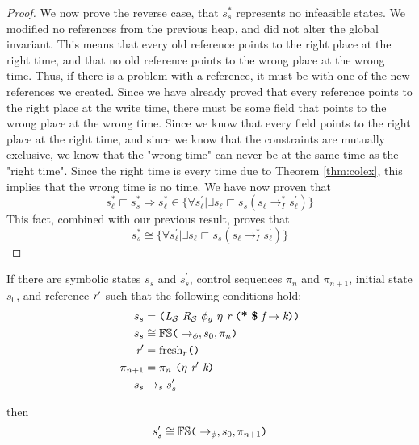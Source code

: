 \begin{proof}
We now prove the reverse case, that $s_s^*$ represents no infeasible states. We modified no references from the previous heap, and did not alter the global invariant. This means that every old reference points to the right place at the right time, and that no old reference points to the wrong place at the wrong time.  Thus, if there is a problem with a reference, it must be with one of the new references we created. Since we have already proved that every reference points to the right place at the write time, there must be some field that points to the wrong place at the wrong time. Since we know that every field points to the right place at the right time, and since we know that the constraints are mutually exclusive, we know that the "wrong time" can never be at the same time as the "right time". Since the right time is every time due to Theorem \ref{thm:colex}, this implies that the wrong time is no time. We have now proven that 
$$ s_\ell^* \sqsubset s_s^*  \Rightarrow  s_\ell^* \in \{\forall s_\ell^\prime | \exists s_\ell \sqsubset s_s (s_\ell \rightarrow_I^* s_\ell^\prime)  \}$$
This fact, combined with our previous result, proves that
$$s_s^*  \cong \{\forall s_\ell^\prime | \exists s_\ell \sqsubset s_s (s_\ell \rightarrow_I^* s_\ell^\prime)  \}$$

\end{proof}

\begin{lemma}
\label{lem:access}
If there are symbolic states $s_s$ and $s_s^\prime$, control sequences $\pi_n$ and $\pi_{n+1}$, initial state $s_0$, and reference $\emph{r}^\prime$ such that the following conditions hold:
\begin{align}
s_s &= \lp \cfgnt{L}_{\mathcal{S}}\ \cfgnt{R}_{\mathcal{S}}\ \phi_g\ \eta\ \cfgnt{r}\ \lp \cfgt{*}\ \cfgt{\$}\ \cfgnt{f} \rightarrow \cfgnt{k}\rp \rp \\
s_s &\cong \mathbb{FS}\lp \rightarrow_{\phi},s_0,\pi_n\rp \\
\cfgnt{r}^\prime &= \mathrm{fresh}_r\lp \rp \\
\pi_{n+1} &=\pi_n\ \lp \eta\ \cfgnt{r}^\prime\ \cfgnt{k} \rp \\
s_s &\rightarrow_s s_s^\prime
\end{align}

then 
$$s_s^\prime \cong \mathbb{FS}\texttt{(} \rightarrow_{\phi},s_0,\pi_{n+1} \texttt{)}$$
\end{lemma}

